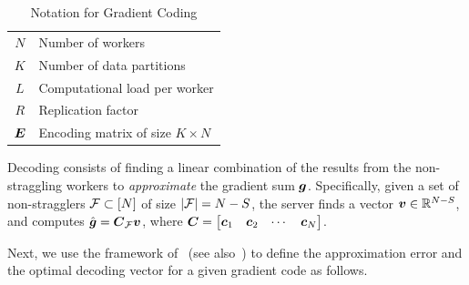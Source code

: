 \documentclass[conference,letterpaper]{IEEEtran}
\begin{document}
\begin{table}[!t]
    \renewcommand{\arraystretch}{1.2}
    \caption{Notation for Gradient Coding}
    \label{tab:gradient-coding}
    \centering
    \begin{tabular}{|c|l|}
    \hline
    $N$ & Number of workers\\
    $K$ & Number of data partitions\\
    $L$ & Computational load per worker\\
    $R$ & Replication factor\\
    $\boldsymbol{E}$  & Encoding matrix of size $K\times N$\\
    \hline
    \end{tabular}
\end{table}

Decoding consists of finding a linear combination of the results from the non-straggling workers to {\it approximate} the gradient sum $\boldsymbol{g}$. Specifically, given a set of non-stragglers $\mathcal{F}\subset[N]$ of size $|\mathcal{F}| = N-S$, the server finds a vector $\boldsymbol{v}\in\mathbb{R}^{N-S}$, and computes $\hat{\boldsymbol{g}} = \boldsymbol{C}_{\mathcal{F}} \boldsymbol{v}$, where $\boldsymbol{C} = \begin{bmatrix} \boldsymbol{c}_1 & \boldsymbol{c}_2 & \cdots & \boldsymbol{c}_{N}\end{bmatrix}$.

Next, we use the framework of~\cite{CharlesP:17} (see also~\cite{Raviv:18,CharlesP:18}) to define the approximation error and the optimal decoding vector for a given gradient code as follows. 
\end{document}
